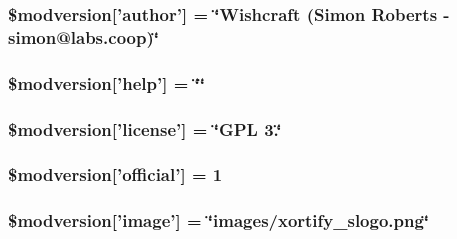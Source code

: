 \hypertarget{xoops__version_8php_a71cc638deee036400821a7fbe821c9c0}{
\subsubsection[{\$modversion}]{\setlength{\rightskip}{0pt plus 5cm}\$modversion\mbox{[}'author'\mbox{]} = \char`\"{}Wishcraft (Simon Roberts -\/ simon@labs.\-coop)\char`\"{}}}\label{xoops__version_8php_a71cc638deee036400821a7fbe821c9c0}
\hypertarget{xoops__version_8php_ab024cf3ad0ca97d54e30a29c04a00d21}{
\subsubsection[{\$modversion}]{\setlength{\rightskip}{0pt plus 5cm}\$modversion\mbox{[}'help'\mbox{]} = \char`\"{}\char`\"{}}}\label{xoops__version_8php_ab024cf3ad0ca97d54e30a29c04a00d21}
\hypertarget{xoops__version_8php_ac01b0a110a2b2471b022408cc144ba6a}{
\subsubsection[{\$modversion}]{\setlength{\rightskip}{0pt plus 5cm}\$modversion\mbox{[}'license'\mbox{]} = \char`\"{}G\-P\-L 3.\char`\"{}}}\label{xoops__version_8php_ac01b0a110a2b2471b022408cc144ba6a}
\hypertarget{xoops__version_8php_a67cc0580683a24bde7fb2a93a6b0b8b3}{
\subsubsection[{\$modversion}]{\setlength{\rightskip}{0pt plus 5cm}\$modversion\mbox{[}'official'\mbox{]} = 1}}\label{xoops__version_8php_a67cc0580683a24bde7fb2a93a6b0b8b3}
\hypertarget{xoops__version_8php_a2372fb2a0d0c8276a91ee60be1ba845b}{
\subsubsection[{\$modversion}]{\setlength{\rightskip}{0pt plus 5cm}\$modversion\mbox{[}'image'\mbox{]} = \char`\"{}images/xortify\-\_\-slogo.\-png\char`\"{}}}\label{xoops__version_8php_a2372fb2a0d0c8276a91ee60be1ba845b}

